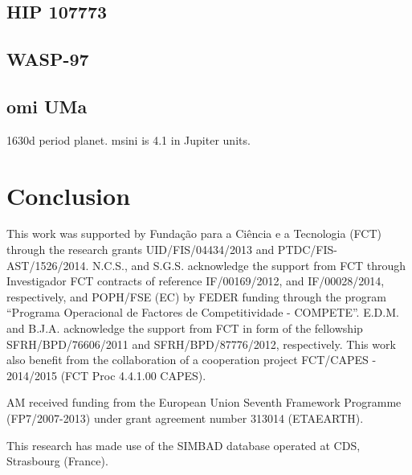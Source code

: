 \documentclass{aa}
\begin{document}
\subsection{HIP 107773}
\label{sub:HIP_107773}

\subsection{WASP-97}
\label{sub:WASP-97}



\subsection{omi UMa}
\label{sub:omiUMa}
1630d period planet. msini is 4.1 in Jupiter units.







\section{Conclusion}
\label{sec:conclusion}




\begin{acknowledgements}

This work was supported by Funda\c{c}\~ao para a Ci\^encia e a Tecnologia (FCT)
through the research grants UID/FIS/04434/2013 and PTDC/FIS-AST/1526/2014.
N.C.S., and S.G.S. acknowledge the support from FCT through Investigador FCT
contracts of reference IF/00169/2012, and IF/00028/2014, respectively, and
POPH/FSE (EC) by FEDER funding through the program “Programa Operacional de
Factores de Competitividade - COMPETE”. E.D.M. and B.J.A. acknowledge the
support from FCT in form of the fellowship SFRH/BPD/76606/2011 and
SFRH/BPD/87776/2012, respectively. This work also benefit from the collaboration
of a cooperation project FCT/CAPES - 2014/2015 (FCT Proc 4.4.1.00 CAPES).

AM received funding from the European Union Seventh Framework Programme
(FP7/2007-2013) under grant agreement number 313014 (ETAEARTH).

This research has made use of the SIMBAD database operated at CDS, Strasbourg
(France).

\end{acknowledgements}




\end{document}

